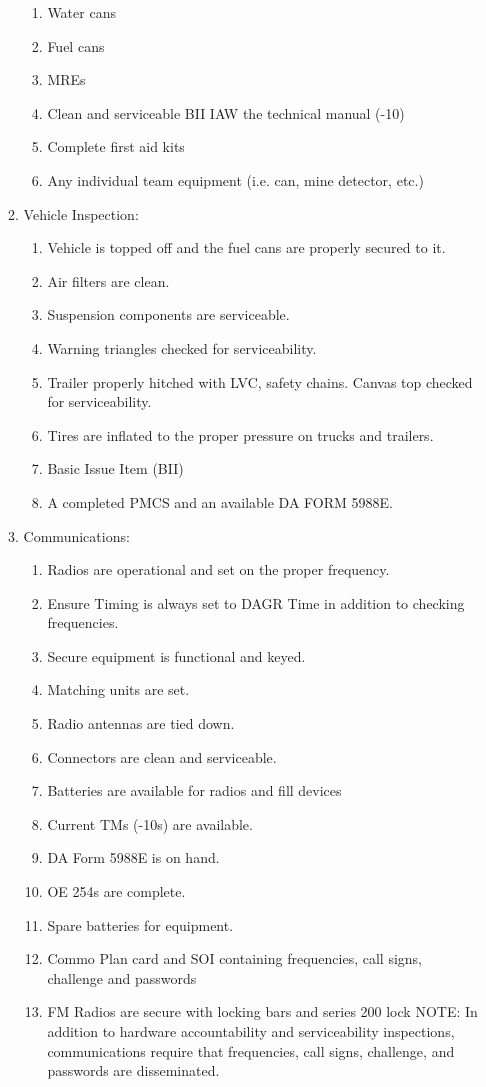 \documentclass{article}
\begin{document}
\begin{enumerate}
\begin{enumerate}
\begin{enumerate}
\item	Water cans
\item	Fuel cans
\item	MREs
\item	Clean and serviceable BII IAW the technical manual (-10)
\item	Complete first aid kits
\item	Any individual team equipment (i.e. can, mine detector, etc.)
\end{enumerate}
\item Vehicle Inspection:
\begin{enumerate}
\item	Vehicle is topped off and the fuel cans are properly secured to it.
\item	Air filters are clean.
\item	Suspension components are serviceable.
\item	Warning triangles checked for serviceability.
\item	Trailer properly hitched with LVC, safety chains. Canvas top checked for serviceability.
\item	Tires are inflated to the proper pressure on trucks and trailers.
\item	Basic Issue Item (BII)
\item	A completed PMCS and an available DA FORM 5988E.
\end{enumerate}
\item Communications:
\begin{enumerate}
\item	Radios are operational and set on the proper frequency.
\item	Ensure Timing is always set to DAGR Time in addition to checking frequencies.
\item	Secure equipment is functional and keyed.
\item	Matching units are set.
\item	Radio antennas are tied down.
\item	Connectors are clean and serviceable.
\item	Batteries are available for radios and fill devices
\item	Current TMs (-10s) are available.
\item	DA Form 5988E is on hand.
\item	OE 254s are complete.
\item	Spare batteries for equipment.
\item	Commo Plan card and SOI containing frequencies, call signs, challenge and passwords
\item	FM Radios are secure with locking bars and series 200 lock
NOTE: In addition to hardware accountability and serviceability inspections, communications require that frequencies, call signs, challenge, and passwords are disseminated.
\end{enumerate}


\end{enumerate}
\end{enumerate}
\end{document}
